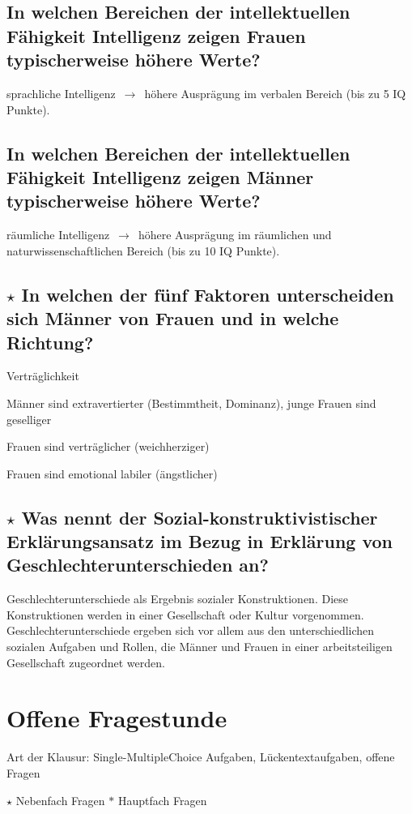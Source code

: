 \documentclass[a4paper,9pt,DIV=14]{scrartcl}
\begin{document}
\subsection{In welchen Bereichen der intellektuellen Fähigkeit Intelligenz zeigen Frauen typischerweise höhere Werte?}
sprachliche Intelligenz $\,\to\,$ höhere Ausprägung im verbalen Bereich (bis zu 5 IQ Punkte).
\subsection{In welchen Bereichen der intellektuellen Fähigkeit Intelligenz zeigen Männer typischerweise höhere Werte?}
räumliche Intelligenz $\,\to\,$ höhere Ausprägung im räumlichen und naturwissenschaftlichen Bereich (bis zu 10 IQ Punkte).
\subsection{$\star$ In welchen der fünf Faktoren unterscheiden sich Männer von Frauen und in welche Richtung?} %
\begin{labeling}{Verträglichkeit}
\item [Extraversion] Männer sind extravertierter (Bestimmtheit, Dominanz), junge Frauen sind geselliger
\item [Verträglichkeit] Frauen sind verträglicher (weichherziger)
\item [Neurotizismus] Frauen sind emotional labiler (ängstlicher)
\end{labeling}
\subsection{$\star$ Was nennt der Sozial-konstruktivistischer Erklärungsansatz im Bezug in Erklärung von Geschlechterunterschieden an?} %
Geschlechterunterschiede als Ergebnis sozialer Konstruktionen. Diese Konstruktionen werden in einer Gesellschaft oder Kultur vorgenommen. Geschlechterunterschiede ergeben sich vor allem aus den unterschiedlichen sozialen Aufgaben und Rollen, die Männer und Frauen in einer arbeitsteiligen Gesellschaft zugeordnet werden.

\section{Offene Fragestunde}
Art der Klausur:
Single-MultipleChoice Aufgaben, Lückentextaufgaben, offene Fragen

$\star$ Nebenfach Fragen
$\ast$ Hauptfach Fragen
\end{document}
